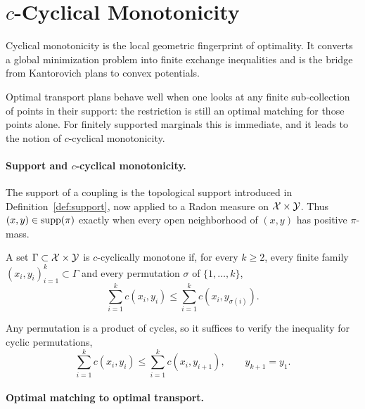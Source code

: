 \section{\texorpdfstring{$c$}{c}-Cyclical Monotonicity}
\label{sec-cyclical-monotonicity}

Cyclical monotonicity is the local geometric fingerprint of optimality. It converts a global minimization problem into finite exchange inequalities and is the bridge from Kantorovich plans to convex potentials.

Optimal transport plans behave well when one looks at any finite sub-collection of points in their support: the restriction is still an optimal matching for those points alone. For finitely supported marginals this is immediate, and it leads to the notion of $c$-cyclical monotonicity.

\paragraph{Support and $c$-cyclical monotonicity.}

The support of a coupling is the topological support introduced in Definition~\ref{def:support}, now applied to a Radon measure on $\mathcal{X}\times\mathcal{Y}$. Thus $(x,y)\in\operatorname{supp}(\pi)$ exactly when every open neighborhood of $(x,y)$ has positive $\pi$-mass.

\begin{defn}\label{def:ccm}
	A set $\Gamma\subset\mathcal{X}\times\mathcal{Y}$ is $c$-cyclically monotone if, for every $k\geq2$, every finite family $(x_i,y_i)_{i=1}^k\subset\Gamma$ and every permutation $\sigma$ of $\{1,\ldots,k\}$,
	\[
		\sum_{i=1}^k c(x_i,y_i)
		\leq
		\sum_{i=1}^k c(x_i,y_{\sigma(i)}).
	\]
\end{defn}

Any permutation is a product of cycles, so it suffices to verify the inequality for cyclic permutations,
\[
	\sum_{i=1}^k c(x_i,y_i)
	\leq
	\sum_{i=1}^k c(x_i,y_{i+1}),
	\qquad y_{k+1}=y_1.
\]

\paragraph{Optimal matching to optimal transport.}

